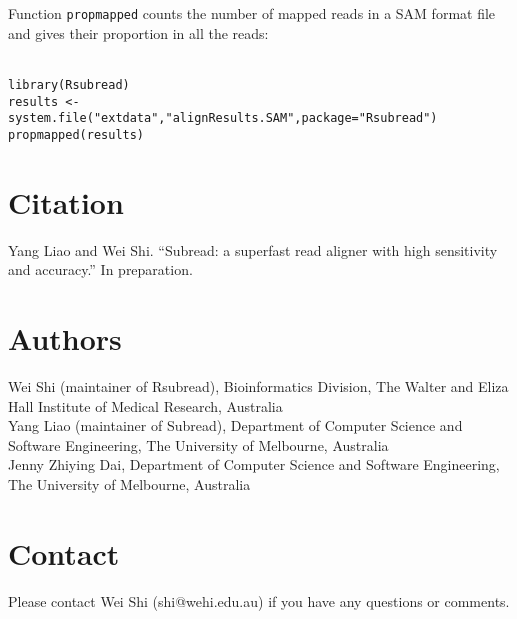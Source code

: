 \documentclass[12pt]{article}
\newcommand{\R}[1]{{\texttt{#1}}}
\begin{document}
Function \R{propmapped} counts the number of mapped reads in a SAM format file and gives their proportion in all the reads:

\R{\\
library(Rsubread)\\
results <- system.file("extdata","alignResults.SAM",package="Rsubread")\\
propmapped(results)\\
}

\section{Citation}
Yang Liao and Wei Shi. ``Subread: a superfast read aligner with high sensitivity and accuracy.'' In preparation.

\section{Authors}
Wei Shi (maintainer of Rsubread), Bioinformatics Division, The Walter and Eliza Hall Institute of Medical Research, Australia \\
Yang Liao (maintainer of Subread), Department of Computer Science and Software Engineering, The University of Melbourne, Australia \\
Jenny Zhiying Dai, Department of Computer Science and Software Engineering, The University of Melbourne, Australia

\section{Contact}
Please contact Wei Shi (shi@wehi.edu.au) if you have any questions or comments.
\end{document}
